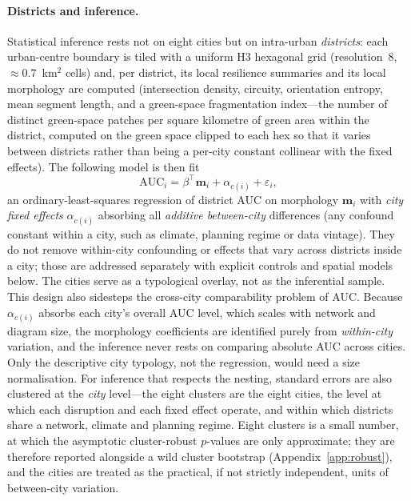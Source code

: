 \documentclass[sn-mathphys-num,pdflatex]{sn-jnl}
\begin{document}
\paragraph{Districts and inference.} Statistical inference rests not on eight
cities but on intra-urban \emph{districts}: each urban-centre boundary is tiled
with a uniform H3 hexagonal grid (resolution~8, $\approx0.7$~km$^2$ cells) and,
per district, its local resilience summaries and its local morphology are computed
(intersection density, circuity, orientation entropy, mean segment length, and a
green-space fragmentation index---the number of distinct green-space patches per
square kilometre of green area within the district, computed on the green space
clipped to each hex so that it varies between districts rather than being a
per-city constant collinear with the fixed effects). The following model is then fit
\[
\mathrm{AUC}_i = \beta^\top \mathbf{m}_i + \alpha_{c(i)} + \varepsilon_i,
\]
an ordinary-least-squares regression of district AUC on morphology
$\mathbf{m}_i$ with \emph{city fixed effects} $\alpha_{c(i)}$ absorbing all
\emph{additive between-city} differences (any confound constant within a city, such
as climate, planning regime or data vintage). They do not remove within-city
confounding or effects that vary across districts inside a city; those are addressed
separately with explicit controls and spatial models below. The cities serve
as a typological overlay, not as the inferential sample. This design also sidesteps the cross-city comparability
problem of AUC. Because $\alpha_{c(i)}$ absorbs each city's overall AUC level, which
scales with network and diagram size, the morphology coefficients are identified
purely from \emph{within-city} variation, and the inference never rests on comparing
absolute AUC across cities. Only the descriptive city typology, not the regression,
would need a size normalisation. For inference that respects the nesting, standard
errors are also clustered at the \emph{city} level---the eight clusters are the eight
cities, the level at which each disruption and each fixed effect operate, and within
which districts share a network, climate and planning regime. Eight clusters is a
small number, at which the asymptotic cluster-robust $p$-values are only approximate;
they are therefore reported alongside a wild cluster bootstrap
(Appendix~\ref{app:robust}), and the cities are treated as the practical, if not
strictly independent, units of between-city variation.
\end{document}
